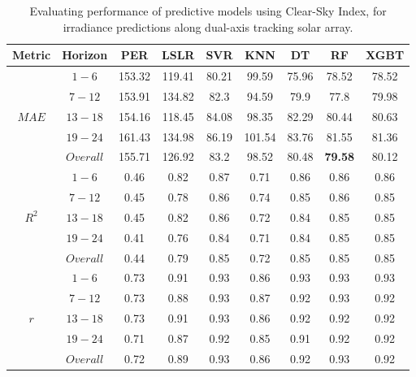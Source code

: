\begin{table}[h]
\begin{center}
    \caption{Evaluating performance of predictive models using Clear-Sky Index, for irradiance predictions along dual-axis tracking solar array.}
    \vspace{0.2cm}
    \label{Tab:mmb_array_a}
    \begin{tabular}{ccccccccc}
    \toprule
    \textbf{Metric} & \textbf{Horizon} & \textbf{PER} & \textbf{LSLR} & \textbf{SVR} & \textbf{KNN} & \textbf{DT} & \textbf{RF} & \textbf{XGBT} \\
    \midrule
    \multirow{5}{*}{$MAE$}  & $1 - 6$ & 153.32 & 119.41 & 80.21 & 99.59  & 75.96 & 78.52 & 78.52 \\
                            & $7 - 12$ & 153.91 & 134.82 & 82.3  & 94.59  & 79.9  & 77.8  & 79.98 \\
                            & $13 - 18$ & 154.16 & 118.45 & 84.08 & 98.35  & 82.29 & 80.44 & 80.63 \\
                            & $19 - 24$ & 161.43 & 134.98 & 86.19 & 101.54 & 83.76 & 81.55 & 81.36 \\
                            & $Overall$ & 155.71 & 126.92 & 83.2  & 98.52  & 80.48 & \textbf{79.58} & 80.12 \\
                            \midrule
    \multirow{5}{*}{$R^2$}  & $1 - 6$ & 0.46 & 0.82   & 0.87  & 0.71   & 0.86  & 0.86  & 0.86  \\
                            & $7 - 12$ & 0.45 & 0.78   & 0.86  & 0.74   & 0.85  & 0.86  & 0.85  \\
                            & $13 - 18$ & 0.45 & 0.82   & 0.86  & 0.72   & 0.84  & 0.85  & 0.85  \\
                            & $19 - 24$ & 0.41 & 0.76   & 0.84  & 0.71   & 0.84  & 0.85  & 0.85  \\
                            & $Overall$ & 0.44 & 0.79   & 0.85  & 0.72   & 0.85  & 0.85  & 0.85  \\
                            \midrule
    \multirow{5}{*}{$r$}    & $1 - 6$ & 0.73 & 0.91   & 0.93  & 0.86   & 0.93  & 0.93  & 0.93  \\
                            & $7 - 12$ & 0.73 & 0.88   & 0.93  & 0.87   & 0.92  & 0.93  & 0.92  \\
                            & $13 - 18$ & 0.73 & 0.91   & 0.93  & 0.86   & 0.92  & 0.92  & 0.92  \\
                            & $19 - 24$ & 0.71 & 0.87   & 0.92  & 0.85   & 0.91  & 0.92  & 0.92  \\
                            & $Overall$ & 0.72 & 0.89   & 0.93  & 0.86   & 0.92  & 0.93  & 0.92 \\    
    \bottomrule
    \end{tabular}
\end{center}
\end{table}

